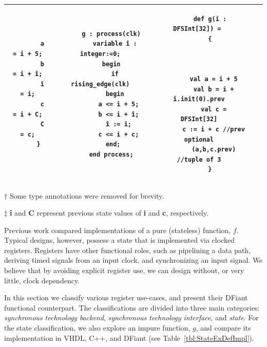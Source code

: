 \begin{table}
\begin{threeparttable}
\begin{tabular}{|c|c|c|c|c|}
\begin{minipage}[b]{0.14\linewidth}
\begin{verbatim}
        a = i + 5;
        b = i + î;
        î = i;
        c = i + C;
        C = c;
      }
		\end{verbatim}
	\end{minipage}
	&
	\begin{minipage}[b]{0.21\linewidth}
		\begin{verbatim}
      g : process(clk)
        variable î : integer:=0;
      begin
        if rising_edge(clk)
        begin
          a <= i + 5;
          b <= i + î;
          î := i;
          c <= i + c;
        end; 
      end process;
			\end{verbatim}
	\end{minipage}
	&
	\begin{minipage}[b]{0.23\linewidth}
		\begin{verbatim}
      def g(i : DFSInt[32]) = 
      {
        
        
        
        val a = i + 5
        val b = i + i.init(0).prev
        val c = DFSInt[32]
        c := i + c //prev optional
        (a,b,c.prev) //tuple of 3
      }
		\end{verbatim}
	\end{minipage}
  \\
  \hline
  \end{tabular}
  \begin{tablenotes}
    \item [†] Some type annotations were removed for brevity.
    \item [‡] \textbf{î} and \textbf{C} represent previous state values of \textbf{i} and \textbf{c}, respectively.
  \end{tablenotes}
  \end{threeparttable}
\end{table}%

Previous work \cite{Port2017} compared implementations of a pure (stateless) function, $f$. Typical designs, however, possess a state that is implemented via clocked registers. Registers have other functional roles, such as pipelining a data path, deriving timed signals from an input clock, and synchronizing an input signal. We believe that by avoiding explicit register use, we can design without, or very little, clock dependency. 

In this section we classify various register use-cases, and present their DFiant functional counterpart. The classifications are divided into three main categories: \textit{synchronous technology backend}, \textit{synchronous technology interface}, and \textit{state}. For the state classification, we also explore an impure function, $g$, and compare its implementation in VHDL, C++, and DFiant (see Table~\ref{tbl:StateExDefImpl}).

